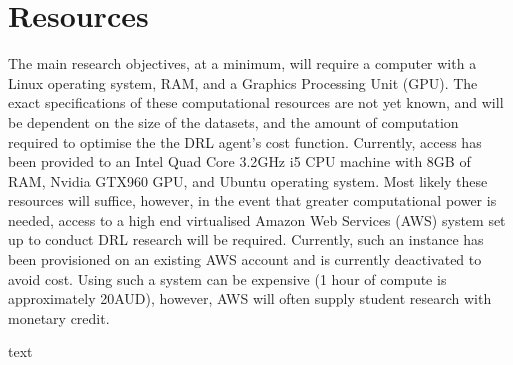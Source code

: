 \documentclass[12pt, a4paper]{article}
\begin{document}
\section{Resources}
The main research objectives, at a minimum, will require a computer with a Linux operating system, RAM, and a Graphics Processing Unit (GPU). The exact specifications of these computational resources are not yet known, and will be dependent on the size of the datasets, and the amount of computation required to optimise the the DRL agent's cost function. Currently, access has been provided to an Intel Quad Core 3.2$\si{\giga\hertz}$ i5 CPU machine with 8GB of RAM, Nvidia GTX960 GPU, and Ubuntu operating system. Most likely these resources will suffice, however, in the event that greater computational power is needed, access to a high end virtualised Amazon Web Services (AWS) system set up to conduct DRL research will be required. Currently, such an instance has been provisioned on an existing AWS account and is currently deactivated to avoid cost. Using such a system can be expensive (1 hour of compute is approximately 20AUD), however, AWS will often supply student research with monetary credit.\\
\begin{table}[h]
	\caption{text}
	\centering
	\begin{tabular}{ll}
	\toprule
	
	\midrule
	
	\bottomrule
	\end{tabular}
\end{table}

\newpage



\end{document}
